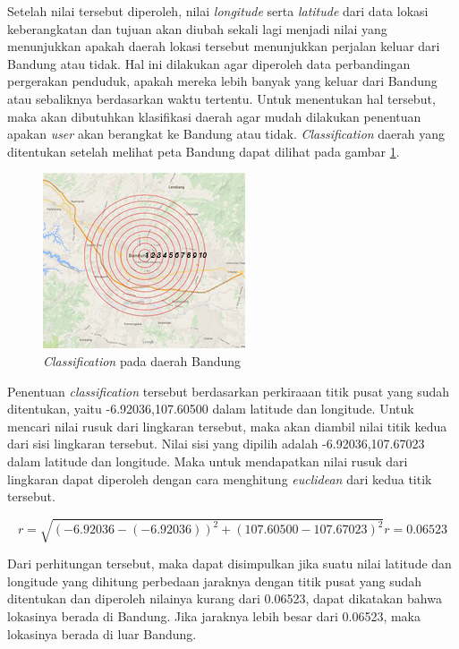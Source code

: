 Setelah nilai tersebut diperoleh, nilai \textsl{longitude} serta \textsl{latitude} dari data lokasi keberangkatan dan tujuan akan diubah sekali lagi menjadi nilai yang menunjukkan apakah daerah lokasi tersebut menunjukkan perjalan keluar dari Bandung atau tidak. Hal ini dilakukan agar diperoleh data perbandingan pergerakan penduduk, apakah mereka lebih banyak yang keluar dari Bandung atau sebaliknya berdasarkan waktu tertentu. Untuk menentukan hal tersebut, maka akan dibutuhkan klasifikasi daerah agar mudah dilakukan penentuan apakan \textsl{user} akan berangkat ke Bandung atau tidak. \textsl{Classification} daerah yang ditentukan setelah melihat peta Bandung dapat dilihat pada gambar \ref{fig:classificationMap}.

\begin{figure}
\includegraphics[scale=1]{Gambar/classificationmap.jpg}
\caption[\textsl{Classification} pada daerah Bandung]{\textsl{Classification} pada daerah Bandung}
\label{fig:classificationMap} 
\end{figure}

Penentuan \textsl{classification} tersebut berdasarkan perkiraaan titik pusat yang sudah ditentukan, yaitu -6.92036,107.60500 dalam latitude dan longitude. Untuk mencari nilai rusuk dari lingkaran tersebut, maka akan diambil nilai titik kedua dari sisi lingkaran tersebut. Nilai sisi yang dipilih adalah -6.92036,107.67023 dalam latitude dan longitude. Maka untuk mendapatkan nilai rusuk dari lingkaran dapat diperoleh dengan cara menghitung \textsl{euclidean} dari kedua titik tersebut.

\begin{displaymath}
	r = \sqrt{(-6.92036 - (-6.92036))^{2} + (107.60500 - 107.67023)^{2}}
	r = 0.06523
\end{displaymath}

Dari perhitungan tersebut, maka dapat disimpulkan jika suatu nilai latitude dan longitude yang dihitung perbedaan jaraknya dengan titik pusat yang sudah ditentukan dan diperoleh nilainya kurang dari 0.06523, dapat dikatakan bahwa lokasinya berada di Bandung. Jika jaraknya lebih besar dari 0.06523, maka lokasinya berada di luar Bandung.

